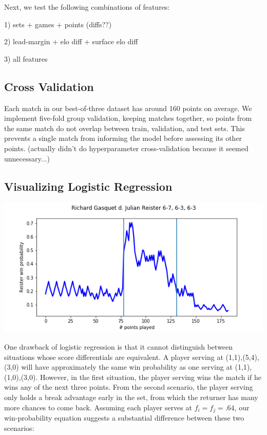 \documentclass[chapterprefix=false]{report}
\begin{document}
Next, we test the following combinations of features:

1) sets + games + points (diffs??)

2) lead-margin + elo diff + surface elo diff

3) all features

\subsection{Cross Validation}

Each match in our best-of-three dataset has around 160 points on average. We implement five-fold group validation, keeping matches together, so points from the same match do not overlap between train, validation, and test sets. This prevents a single match from informing the model before assessing its other points. (actually didn't do hyperparameter cross-validation because it seemed unnecessary...)

\subsection{Visualizing Logistic Regression}

\includegraphics[scale=.7]{gasquet_reister_9_6_all_features}

One drawback of logistic regression is that it cannot distinguish between situations whose score differentials are equivalent. A player serving at (1,1),(5,4),(3,0) will have approximately the same win probability as one serving at (1,1),(1,0),(3,0). However, in the first situation, the player serving wins the match if he wins any of the next three points. From the second scenario, the player serving only holds a break advantage early in the set, from which the returner has many more chances to come back. Assuming each player serves at $f_i=f_j=.64$, our win-probability equation suggests a substantial difference between these two scenarios:
\end{document}
